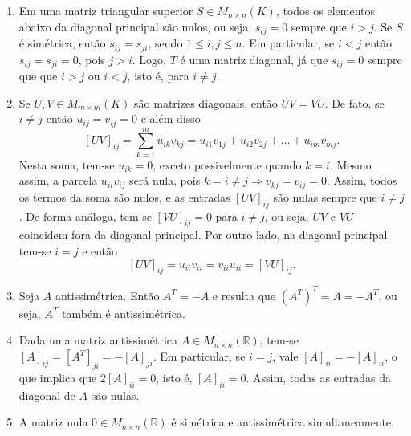 \documentclass[12pt,a4paper]{article}
\newcommand*\R{\mathbb{R}}
\begin{document}
\begin{enumerate}
\begin{enumerate}
\item Em uma matriz triangular superior $S \in M_{n \times n}(K)$, todos os elementos abaixo da diagonal principal são nulos, ou seja, $s_{ij} = 0$ sempre que $i > j$. Se $S$ é simétrica, então $s_{ij} = s_{ji}$, sendo $1 \leq i,j \leq n$. Em particular, se $i < j$ então $s_{ij} = s_{ji} = 0$, pois $j > i$. Logo, $T$ é uma matriz diagonal, já que $s_{ij} = 0$ sempre que que $i > j$ ou $i < j$, isto é, para $i \neq j$.

\item Se $U, V \in M_{m \times m} (K)$ são matrizes diagonais, então $UV = VU$. De fato, se $i \neq j$ então $u_{ij} = v_{ij} = 0$ e além disso
\[
\left[UV\right]_{ij}
= \sum_{k=1}^m u_{ik} v_{kj}
= u_{i1} v_{1j} + u_{i2} v_{2j} + \ldots + u_{im} v_{mj}.
\]
Nesta soma, tem-se $u_{ik} = 0$, exceto possivelmente quando $k = i$. Mesmo assim, a parcela $u_{ii}v_{ij}$ será nula, pois $k = i \neq j \Rightarrow v_{kj} = v_{ij} = 0$. Assim, todos os termos da soma são nulos, e as entradas $\left[UV\right]_{ij}$ são nulas sempre que $i \neq j$. De forma análoga, tem-se $\left[VU\right]_{ij} = 0 $ para $i \neq j$, ou seja, $UV$ e $VU$ coincidem fora da diagonal principal. Por outro lado, na diagonal principal tem-se $i = j$ e então
\[
\left[UV\right]_{ij} = u_{ii} v_{ii} = v_{ii} u_{ii} = \left[VU\right]_{ij}.
\]

\item Seja $A$ antissimétrica. Então $A^T = -A$ e resulta que $
\left( A^T \right)^T = A = -A^T$, ou seja, $A^T$ também é antissimétrica.

\item Dada uma matriz antissimétrica $A \in M_{n \times n}(\R)$, tem-se $[A]_{ij} = [A^T]_{ji} = -[A]_{ji}$. Em particular, se $i = j$, vale $[A]_{ii} = -[A]_{ii}$, o que implica que  $2[A]_{ii} = 0$, isto é,  $[A]_{ii} = 0$. Assim, todas as entradas da diagonal de $A$ são nulas.

\item A matriz nula $0 \in M_{n \times n}(\R)$ é simétrica e antissimétrica simultaneamente.

\end{enumerate}



\end{enumerate}
\end{document}
